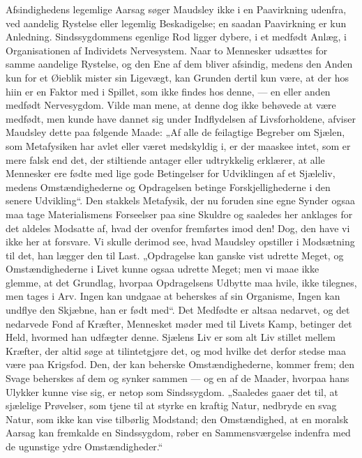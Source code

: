\documentclass[12pt,a4paper,openany]{book}
\newcommand{\opage}[1]{\marginnote{\footnotesize\textit{[#1]}}}
\begin{document}
Afsindighedens legemlige Aarsag søger Maudsley ikke i
en Paavirkning udenfra, ved aandelig Rystelse eller legemlig
Beskadigelse; en saadan Paavirkning er kun Anledning.
Sindssygdommens egenlige Rod ligger dybere, i et medfødt
Anlæg, i Organisationen af Individets Nervesystem. Naar
to Mennesker udsættes for samme aandelige Rystelse, og den
Ene af dem bliver afsindig, medens den Anden kun for et
Øieblik mister sin Ligevægt, kan Grunden dertil kun
være, at der hos hiin er en Faktor med i Spillet, som ikke
findes hos denne, --- en eller anden medfødt Nervesygdom.
Vilde man mene, at denne dog ikke behøvede at være medfødt,
men kunde have dannet sig under Indflydelsen af Livsforholdene,
afviser Maudsley dette paa følgende Maade:
„Af alle de feilagtige Begreber om Sjælen, som Metafysiken
har avlet eller været medskyldig i, er der maaskee intet, som
er mere falsk end det, der stiltiende antager eller udtrykkelig
erklærer, at alle Mennesker ere fødte med lige gode Betingelser
for Udviklingen af et Sjæleliv, medens Omstændighederne
og Opdragelsen betinge Forskjellighederne i den senere
Udvikling“. Den stakkels Metafysik, der nu foruden sine
egne Synder ogsaa maa tage Materialismens Forseelser paa
sine Skuldre og saaledes her anklages for det aldeles Modsatte
af, hvad der ovenfor fremførtes imod den! Dog, den
have vi ikke her at forsvare. Vi skulle derimod see, hvad
Maudsley opstiller i Modsætning til det, han lægger den
til Last. „Opdragelse kan ganske vist udrette Meget, og
Omstændighederne i Livet kunne ogsaa udrette Meget; men
vi maae ikke glemme, at det Grundlag, hvorpaa Opdragelsens
Udbytte maa hvile, ikke tilegnes, men tages i Arv. Ingen
kan undgaae at beherskes af sin Organisme, Ingen kan
undflye den Skjæbne, han er født med“. Det Medfødte er
altsaa nedarvet, og det nedarvede Fond af Kræfter, Mennesket
\opage{326}møder med til Livets Kamp, betinger det Held, hvormed
han udfægter denne. Sjælens Liv er som alt Liv stillet
mellem Kræfter, der altid søge at tilintetgjøre det, og mod
hvilke det derfor stedse maa være paa Krigsfod. Den, der
kan beherske Omstændighederne, kommer frem; den Svage
beherskes af dem og synker sammen --- og en af de Maader,
hvorpaa hans Ulykker kunne vise sig, er netop som Sindssygdom.
„Saaledes gaaer det til, at sjælelige Prøvelser,
som tjene til at styrke en kraftig Natur, nedbryde en svag Natur,
som ikke kan vise tilbørlig Modstand; den Omstændighed, at
en moralsk Aarsag kan fremkalde en Sindssygdom, røber en
Sammensværgelse indenfra med de ugunstige ydre Omstændigheder.“
\end{document}
